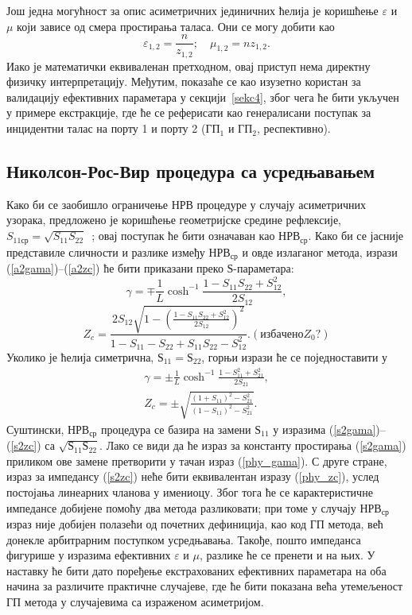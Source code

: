 \documentclass[main.tex]{subfiles}
\begin{document}
Још једна могућност за опис асиметричних јединичних ћелија је коришћење $\varepsilon$ и $\mu$ који зависе од смера простирања таласа. Они се могу добити као
\begin{equation}
\varepsilon_{1,2}=\frac{n}{z_{1,2}};\quad \mu_{1,2}=nz_{1,2}.
\end{equation}
Иако је математички еквиваленан претходном, овај приступ нема директну физичку интерпретацију. Међутим, показаће се као изузетно користан за валидацију ефективних параметара у секцији~\ref{sekc4}, због чега ће бити укључен у примере екстракције, где ће се реферисати као генералисани поступак за инцидентни талас на порту 1 и порту 2 ($ГП_1$ и $ГП_2$, респективно).

\subsection{Николсон-Рос-Вир процедура са усредњавањем}

Како би се заобишло ограничење НРВ процедуре у случају асиметричних узорака, предложено је коришћење геометријске средине рефлексије, $S_{11ср}=\sqrt{S_{11}S_{22}}$~\cite{smith:05}; овај поступак ће бити означаван као $НРВ_{ср}$. Како би се јасније представиле сличности и разлике између $НРВ_{ср}$ и овде излаганог метода, изрази (\ref{a2gama})--(\ref{a2zc}) ће бити приказани преко $Ѕ$-параметара:
\begin{equation}\label{phy_gama}
\gamma=\mp\frac{1}{L}\cosh^{-1}{\frac{1-S_{11}S_{22}+S_{12}^2}{2S_{12}}},%
\end{equation}
\begin{equation}\label{phy_zc}
Z_{c} = \frac{2S_{12}\sqrt{1-\left( \frac{1-S_{11}S_{22}+S_{12}^2}{2S_{12}} \right)^2}}{1-S_{11}-S_{22}+S_{11}S_{22}-S_{12}^2}. (избачено Z_0?)
\end{equation}
Уколико је ћелија симетрична, $Ѕ_{11}=Ѕ_{22}$, горњи изрази ће се поједноставити у
\begin{eqnarray}
\gamma = \pm\frac{1}{L}\cosh^{-1}\frac{1-S_{11}^2+S_{21}^2}{2S_{21}},\label{s2gama} \\
Z_c = \pm \sqrt{\frac{(1+S_{11})^2-S_{21}^2}{(1-S_{11})^2-S_{21}^2}}\label{s2zc}.
\end{eqnarray}
Суштински, $НРВ_{ср}$ процедура се базира на замени $Ѕ_{11}$ у изразима (\ref{s2gama})--(\ref{s2zc}) са $\sqrt{Ѕ_{11}Ѕ_{22}}$. Лако се види да ће израз за константу простирања (\ref{s2gama}) приликом ове замене претворити у тачан израз (\ref{phy_gama}). С друге стране, израз за импедансу (\ref{s2zc}) неће бити еквивалентан изразу (\ref{phy_zc}), услед постојања линеарних чланова у имениоцу. Због тога ће се карактеристичне импедансе добијене помоћу два метода разликовати; при томе у случају $НРВ_{ср}$ израз није добијен полазећи од почетних дефиниција, као код ГП метода, већ донекле арбитрарним поступком усредњавања. Такође, пошто импеданса фигурише у изразима ефективних $\varepsilon$ и $\mu$, разлике ће се пренети и на њих. У наставку ће бити дато поређење екстрахованих ефективних параметара на оба начина за различите практичне случајеве, где ће бити показана већа утемељеност ГП метода у случајевима са израженом асиметријом.
\end{document}
